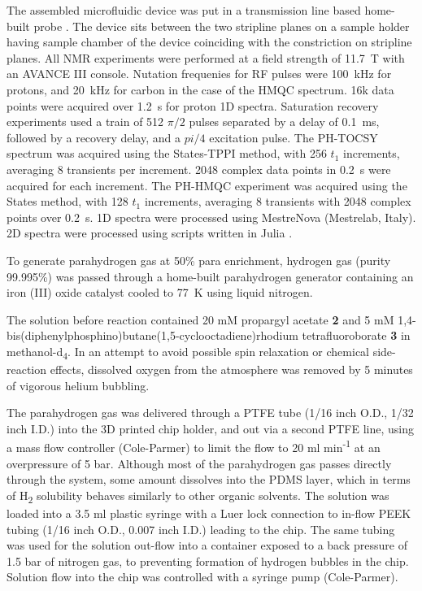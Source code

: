 The assembled microfluidic device was put in a transmission line based
home-built probe \cite{RN164}. The
device sits between the two stripline planes on a sample holder having
sample chamber of the device coinciding with the constriction on
stripline planes. All NMR experiments were performed at a field strength
of 11.7~T with an AVANCE III console. Nutation frequenies for RF pulses
were 100~kHz for protons, and 20~kHz for carbon in the case of the HMQC
spectrum. 16k data points were acquired over 1.2~s for proton 1D spectra.
Saturation recovery experiments used a train of 512 $\pi/2$ pulses
separated by a delay of 0.1~ms, followed by a recovery delay, and a $pi/4$
excitation pulse.
The PH-TOCSY spectrum was acquired using the States-TPPI method,
with 256 $t_1$ increments, averaging 8 transients per increment.
2048 complex data points in 0.2~s were acquired for each increment.
The PH-HMQC experiment was acquired using the States method, with
128 $t_1$ increments, averaging 8 transients with 2048 complex points
over 0.2~s. 1D spectra were processed using MestreNova (Mestrelab, Italy).
2D spectra were processed using scripts written in Julia \cite{Bezanson:2017gd}.

To generate parahydrogen gas at 50\% para enrichment, hydrogen gas
(purity 99.995\%) was passed through a home-built parahydrogen generator
containing an iron (III) oxide catalyst cooled to 77~K using liquid
nitrogen.

The solution before reaction contained 20 mM propargyl acetate \textbf{2}
and 5 mM
1,4-bis(diphenyl\-phosphino)\-butane(1,5-cyclo\-octadiene)\-rhodium
tetra\-fluoro\-borate \textbf{3} in methanol-d\textsubscript{4}. In an attempt to
avoid possible spin relaxation or chemical side-reaction effects,
dissolved oxygen from the atmosphere was removed by 5 minutes of
vigorous helium bubbling.

The parahydrogen gas was delivered through a PTFE tube (1/16 inch O.D.,
1/32 inch I.D.) into the 3D printed chip holder, and out via a second
PTFE line, using a mass flow controller (Cole-Parmer) to limit the flow
to 20 ml min\textsuperscript{-1} at an overpressure of 5 bar. Although
most of the parahydrogen gas passes directly through the system, some
amount dissolves into the PDMS layer, which in terms of
H\textsubscript{2} solubility behaves similarly to other organic
solvents. The solution was loaded into a 3.5 ml plastic syringe with a
Luer lock connection to in-flow PEEK tubing (1/16 inch O.D., 0.007 inch
I.D.) leading to the chip. The same tubing was used for the solution
out-flow into a container exposed to a back pressure of 1.5 bar of
nitrogen gas, to preventing formation of hydrogen bubbles in the chip.
Solution flow into the chip was controlled with a syringe pump (Cole-Parmer).

